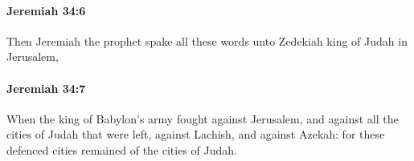 		\paragraph{Jeremiah 34:6} %
			\label{JEREMIAH-34-6}

			Then Jeremiah the prophet spake all these words unto Zedekiah king of Judah in Jerusalem,


		\paragraph{Jeremiah 34:7} %
			\label{JEREMIAH-34-7}

			When the king of Babylon’s army fought against Jerusalem, and against all the cities of Judah that were left, against Lachish, and against Azekah: for these defenced cities remained of the cities of Judah.



